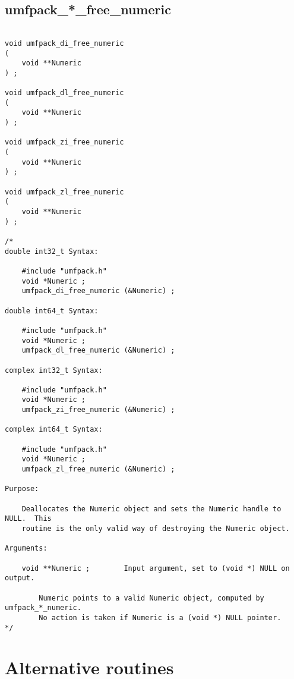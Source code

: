 \documentclass[11pt]{article}
\begin{document}
\newpage
\subsection{umfpack\_*\_free\_numeric}

{\footnotesize
\begin{verbatim}

void umfpack_di_free_numeric
(
    void **Numeric
) ;

void umfpack_dl_free_numeric
(
    void **Numeric
) ;

void umfpack_zi_free_numeric
(
    void **Numeric
) ;

void umfpack_zl_free_numeric
(
    void **Numeric
) ;

/*
double int32_t Syntax:

    #include "umfpack.h"
    void *Numeric ;
    umfpack_di_free_numeric (&Numeric) ;

double int64_t Syntax:

    #include "umfpack.h"
    void *Numeric ;
    umfpack_dl_free_numeric (&Numeric) ;

complex int32_t Syntax:

    #include "umfpack.h"
    void *Numeric ;
    umfpack_zi_free_numeric (&Numeric) ;

complex int64_t Syntax:

    #include "umfpack.h"
    void *Numeric ;
    umfpack_zl_free_numeric (&Numeric) ;

Purpose:

    Deallocates the Numeric object and sets the Numeric handle to NULL.  This
    routine is the only valid way of destroying the Numeric object.

Arguments:

    void **Numeric ;        Input argument, set to (void *) NULL on output.

        Numeric points to a valid Numeric object, computed by umfpack_*_numeric.
        No action is taken if Numeric is a (void *) NULL pointer.
*/
\end{verbatim}
}

\newpage
\section{Alternative routines}
\label{Alternative}
\end{document}
